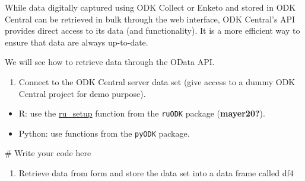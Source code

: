 \documentclass[
  letterpaper,
  DIV=11,
  numbers=noendperiod]{scrreprt}
\newenvironment{Shaded}{\begin{snugshade}}{\end{snugshade}}
\newcommand{\CommentTok}[1]{\textcolor[rgb]{0.37,0.37,0.37}{#1}}
\providecommand{\tightlist}{%
  \setlength{\itemsep}{0pt}\setlength{\parskip}{0pt}}\usepackage{longtable,booktabs,array}
\begin{document}
While data digitally captured using ODK Collect or Enketo and stored in
ODK Central can be retrieved in bulk through the web interface, ODK
Central's API provides direct access to its data (and functionality). It
is a more efficient way to ensure that data are always up-to-date.

We will see how to retrieve data through the OData API.

\begin{enumerate}
\def\labelenumi{\arabic{enumi}.}
\tightlist
\item
  Connect to the ODK Central server data set (give access to a dummy ODK
  Central project for demo purpose).
\end{enumerate}

\begin{tcolorbox}[enhanced jigsaw, left=2mm, colback=white, coltitle=black, toptitle=1mm, bottomrule=.15mm, rightrule=.15mm, leftrule=.75mm, bottomtitle=1mm, colbacktitle=quarto-callout-tip-color!10!white, opacityback=0, arc=.35mm, colframe=quarto-callout-tip-color-frame, titlerule=0mm, title=\textcolor{quarto-callout-tip-color}{\faLightbulb}\hspace{0.5em}{Tip}, breakable, toprule=.15mm, opacitybacktitle=0.6]

\begin{itemize}
\tightlist
\item
  R: use the
  \href{https://docs.ropensci.org/ruODK/reference/ru_setup.html}{ru\_setup}
  function from the \texttt{ruODK} package (\textbf{mayer20?}).
\item
  Python: use functions from the \texttt{pyODK} package.
\end{itemize}

\end{tcolorbox}

\begin{Shaded}
\begin{Highlighting}[]
\CommentTok{\# Write your code here}
\end{Highlighting}
\end{Shaded}

\begin{enumerate}
\def\labelenumi{\arabic{enumi}.}
\setcounter{enumi}{1}
\tightlist
\item
  Retrieve data from form and store the data set into a data frame
  called df4
\end{enumerate}
\end{document}
